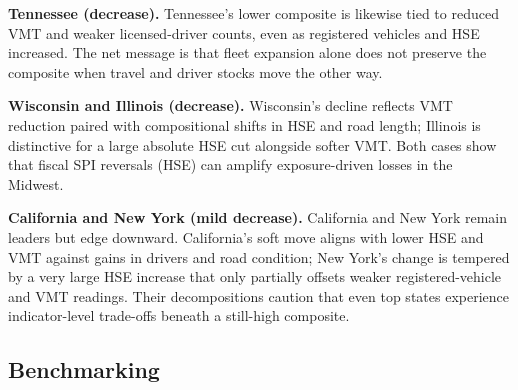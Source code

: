 \documentclass{article}
\begin{document}
\textbf{Tennessee (decrease).} Tennessee's lower composite is likewise tied to reduced VMT and weaker licensed-driver counts, even as registered vehicles and HSE increased. The net message is that fleet expansion alone does not preserve the composite when travel and driver stocks move the other way.

\textbf{Wisconsin and Illinois (decrease).} Wisconsin's decline reflects VMT reduction paired with compositional shifts in HSE and road length; Illinois is distinctive for a large absolute HSE cut alongside softer VMT. Both cases show that fiscal SPI reversals (HSE) can amplify exposure-driven losses in the Midwest.

\textbf{California and New York (mild decrease).} California and New York remain leaders but edge downward. California's soft move aligns with lower HSE and VMT against gains in drivers and road condition; New York's change is tempered by a very large HSE increase that only partially offsets weaker registered-vehicle and VMT readings. Their decompositions caution that even top states experience indicator-level trade-offs beneath a still-high composite.


\subsection{Benchmarking}
\end{document}
